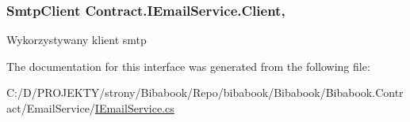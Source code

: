 \subsubsection[{Client}]{\setlength{\rightskip}{0pt plus 5cm}Smtp\+Client Contract.\+I\+Email\+Service.\+Client\hspace{0.3cm}{\ttfamily [get]}, {\ttfamily [set]}}\label{interface_contract_1_1_i_email_service_a251967a7317f40696e5ffbecd71ca93b}


Wykorzystywany klient smtp 



The documentation for this interface was generated from the following file\+:\begin{DoxyCompactItemize}
\item 
C\+:/\+D/\+P\+R\+O\+J\+E\+K\+T\+Y/strony/\+Bibabook/\+Repo/bibabook/\+Bibabook/\+Bibabook.\+Contract/\+Email\+Service/\hyperlink{_i_email_service_8cs}{I\+Email\+Service.\+cs}\end{DoxyCompactItemize}
